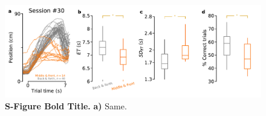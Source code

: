 \begin{figure}[hbt!]
  \begin{center}
    \includegraphics[width=.8\linewidth]{Sfigures/SUPP_BadCtrl.pdf}
    \caption[S-Figure caption]
    {\textbf{S-Figure Bold Title.}
    \textbf{a)}
      Same.
    }
    \label{Sfig-BadCtrl}
  \end{center}
\end{figure}